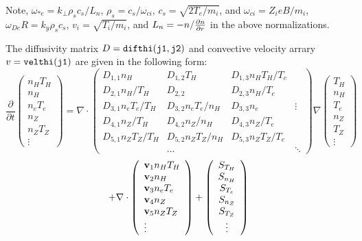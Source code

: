 Note, $ \omega_{*e} = k_\perp \rho_s c_s / L_n $,
$ \rho_s = c_s / \omega_{ci} $, $ c_s = \sqrt{ 2 T_e / m_i} $,
and $ \omega_{ci} = Z_i e B / m_i $,
$ \omega_{De} R = k_y \rho_s c_s $,
$v_i = \sqrt{T_i / m_i}$, and $ L_n = - n / \frac{\partial n}{\partial r} $
in the above normalizations.

The diffusivity matrix $ D = {\tt difthi(j1,j2)}$
and convective velocity arrary $ v = {\tt velthi(j1)} $
are given in the following form:
$$ \frac{\partial}{\partial t}
 \left( \begin{array}{c} n_H T_H  \\ n_H \\ n_e T_e \\
    n_Z \\ n_Z T_Z \\ \vdots
    \end{array} \right)
 = \nabla \cdot
\left( \begin{array}{llll}
D_{1,1} n_H & D_{1,2} T_H & D_{1,3} n_H T_H / T_e \\
D_{2,1} n_H / T_H & D_{2,2} & D_{2,3} n_H / T_e \\
D_{3,1} n_e T_e / T_H & D_{3,2} n_e T_e / n_H & D_{3,3} n_e & \vdots \\
D_{4,1} n_Z / T_H & D_{4,2} n_Z / n_H & D_{4,3} n_Z / T_e \\
D_{5,1} n_Z T_Z / T_H & D_{5,2} n_Z T_Z / n_H &
        D_{5,3} n_Z T_Z / T_e \\
 & \ldots & & \ddots
\end{array} \right)
 \nabla
 \left( \begin{array}{c}  T_H \\ n_H \\  T_e \\
   n_Z \\  T_Z \\ \vdots
    \end{array} \right)
$$
$$
 + \nabla \cdot
\left( \begin{array}{l} {\bf v}_1 n_H T_H \\ {\bf v}_2 n_H \\
   {\bf v}_3 n_e T_e \\
   {\bf v}_4 n_Z \\ {\bf v}_5 n_Z T_Z \\ \vdots \end{array} \right) +
 \left( \begin{array}{c} S_{T_H} \\ S_{n_H} \\ S_{T_e} \\
    S_{n_Z} \\ S_{T_Z} \\ \vdots
    \end{array} \right) $$

